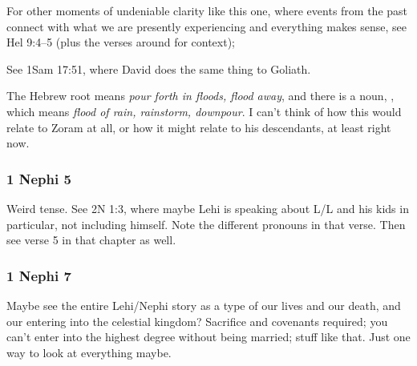 \begin{compactdesc}
\begin{compactdesc}
		For other moments of undeniable clarity like this one, where events from the past connect with what we are presently experiencing and everything makes sense, see Hel 9:4--5 (plus the verses around for context);
		\end{compactdesc}
		
		\item[18$\vert$]
		\begin{compactdesc}
		\item[own sword/cut off head] See 1Sam 17:51, where David does the same thing to Goliath.
		\end{compactdesc}

		\item[35$\vert$]
		\begin{compactdesc}
		\item[Zoram] The Hebrew root  means \textit{pour forth in floods, flood away}, and there is a noun, , which means \textit{flood of rain, rainstorm, downpour}. I can't think of how this would relate to Zoram at all, or how it might relate to his descendants, at least right now.
		\end{compactdesc}

		\end{compactdesc}
		
	\subsubsection{1 Nephi 5} %
	
		\begin{compactdesc}
		
		\item[5$\vert$]
		\begin{compactdesc}
		\item[I have obtained a land of promise] Weird tense. See 2N 1:3, where maybe Lehi is speaking about L/L and his kids in particular, not including himself. Note the different pronouns in that verse. Then see verse 5 in that chapter as well.
		\end{compactdesc}
		
		\end{compactdesc}
		
	\subsubsection{1 Nephi 7} %
	
		\begin{compactdesc}
		
		\item[1$\vert$]
		\begin{compactdesc}
		\item[was not meet to be alone] Maybe see the entire Lehi/Nephi story as a type of our lives and our death, and our entering into the celestial kingdom? Sacrifice and covenants required; you can't enter into the highest degree without being married; stuff like that. Just one way to look at everything maybe.
		\end{compactdesc}
		
		\end{compactdesc}

